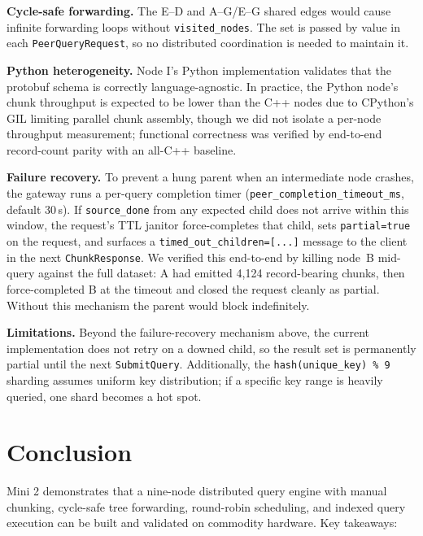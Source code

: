 \documentclass[conference]{IEEEtran}
\begin{document}
\textbf{Cycle-safe forwarding.} The E--D and A--G/E--G shared edges would
cause infinite forwarding loops without \texttt{visited\_nodes}. The set is
passed by value in each \texttt{PeerQueryRequest}, so no distributed
coordination is needed to maintain it.

\textbf{Python heterogeneity.} Node I's Python implementation validates that
the protobuf schema is correctly language-agnostic. In practice, the Python
node's chunk throughput is expected to be lower than the C++ nodes due to
CPython's GIL limiting parallel chunk assembly, though we did not isolate a
per-node throughput measurement; functional correctness was verified by
end-to-end record-count parity with an all-C++ baseline.

\textbf{Failure recovery.} To prevent a hung parent when an intermediate
node crashes, the gateway runs a per-query completion timer
(\texttt{peer\_completion\_timeout\_ms}, default 30\,s). If
\texttt{source\_done} from any expected child does not arrive within this
window, the request's TTL janitor force-completes that child, sets
\texttt{partial=true} on the request, and surfaces a
\texttt{timed\_out\_children=[...]} message to the client in the next
\texttt{ChunkResponse}. We verified this end-to-end by killing node~B
mid-query against the full dataset: A had emitted 4,124 record-bearing
chunks, then force-completed B at the timeout and closed the request
cleanly as partial. Without this mechanism the parent would block
indefinitely.

\textbf{Limitations.} Beyond the failure-recovery mechanism above, the
current implementation does not retry on a downed child, so the result
set is permanently partial until the next \texttt{SubmitQuery}.
Additionally, the \texttt{hash(unique\_key) \% 9} sharding assumes uniform
key distribution; if a specific key range is heavily queried, one shard
becomes a hot spot.

\section{Conclusion}
\label{sec:conclusion}

Mini 2 demonstrates that a nine-node distributed query engine with manual
chunking, cycle-safe tree forwarding, round-robin scheduling, and indexed query
execution can be built and validated on commodity hardware. Key takeaways:
\end{document}

